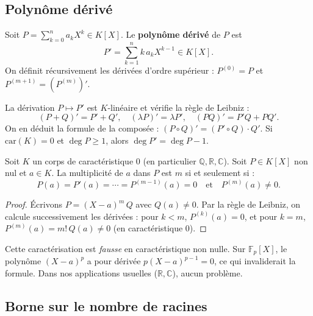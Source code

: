\subsection{Polynôme dérivé}

\begin{definition}
Soit $P = \sum_{k=0}^{n} a_k X^k \in K[X]$. Le \textbf{polynôme dérivé} de $P$ est
\[ P' = \sum_{k=1}^{n} k\, a_k X^{k-1} \in K[X]. \]
On définit récursivement les dérivées d'ordre supérieur : $P^{(0)} = P$ et $P^{(m+1)} = (P^{(m)})'$.
\end{definition}

\begin{proposition}
La dérivation $P \mapsto P'$ est $K$-linéaire et vérifie la règle de Leibniz :
\[ (P + Q)' = P' + Q', \quad (\lambda P)' = \lambda P', \quad (PQ)' = P' Q + P Q'. \]
On en déduit la formule de la composée : $(P \circ Q)' = (P' \circ Q) \cdot Q'$.
Si $\mathrm{car}(K) = 0$ et $\deg P \ge 1$, alors $\deg P' = \deg P - 1$.
\end{proposition}

\begin{theoreme}
Soit $K$ un corps de caractéristique $0$ (en particulier $\mathbb{Q}, \mathbb{R}, \mathbb{C}$). Soit $P \in K[X]$ non nul et $a \in K$. La multiplicité de $a$ dans $P$ est $m$ si et seulement si :
\[ P(a) = P'(a) = \cdots = P^{(m-1)}(a) = 0 \quad \text{et} \quad P^{(m)}(a) \neq 0. \]
\end{theoreme}

\begin{proof}
Écrivons $P = (X - a)^m\, Q$ avec $Q(a) \neq 0$. Par la règle de Leibniz, on calcule successivement les dérivées : pour $k < m$, $P^{(k)}(a) = 0$, et pour $k = m$, $P^{(m)}(a) = m!\, Q(a) \neq 0$ (en caractéristique $0$).
\end{proof}

\begin{remarque}
Cette caractérisation est \emph{fausse} en caractéristique non nulle. Sur $\mathbb{F}_p[X]$, le polynôme $(X - a)^p$ a pour dérivée $p(X-a)^{p-1} = 0$, ce qui invaliderait la formule. Dans nos applications usuelles ($\mathbb{R}, \mathbb{C}$), aucun problème.
\end{remarque}

\subsection{Borne sur le nombre de racines}

